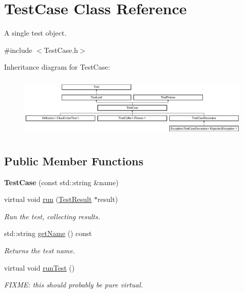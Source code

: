 \hypertarget{class_test_case}{\section{Test\-Case Class Reference}
\label{class_test_case}
}


A single test object.  




{\ttfamily \#include $<$Test\-Case.\-h$>$}

Inheritance diagram for Test\-Case\-:\begin{figure}[H]
\begin{center}
\leavevmode
\includegraphics[height=2.962963cm]{class_test_case}
\end{center}
\end{figure}
\subsection*{Public Member Functions}
\begin{DoxyCompactItemize}
\item 
\hypertarget{class_test_case_af81ee40f823e03175e2f2b965ff3661a}{{\bfseries Test\-Case} (const std\-::string \&name)}\label{class_test_case_af81ee40f823e03175e2f2b965ff3661a}

\item 
\hypertarget{class_test_case_a6bc50d62de5b2d0addf9b0167e34b134}{virtual void \hyperlink{class_test_case_a6bc50d62de5b2d0addf9b0167e34b134}{run} (\hyperlink{class_test_result}{Test\-Result} $\ast$result)}\label{class_test_case_a6bc50d62de5b2d0addf9b0167e34b134}

\begin{DoxyCompactList}\small\item\em Run the test, collecting results. \end{DoxyCompactList}\item 
std\-::string \hyperlink{class_test_case_a833448555e5ce90d826f2b411f47ec3d}{get\-Name} () const 
\begin{DoxyCompactList}\small\item\em Returns the test name. \end{DoxyCompactList}\item 
\hypertarget{class_test_case_a6b55957ac1dfef01e5d9fa2475676f34}{virtual void \hyperlink{class_test_case_a6b55957ac1dfef01e5d9fa2475676f34}{run\-Test} ()}\label{class_test_case_a6b55957ac1dfef01e5d9fa2475676f34}

\begin{DoxyCompactList}\small\item\em F\-I\-X\-M\-E\-: this should probably be pure virtual. \end{DoxyCompactList}\end{DoxyCompactItemize}
